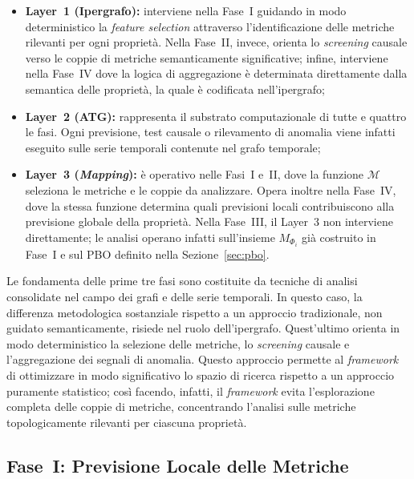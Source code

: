 \begin{itemize}
  \item \textbf{Layer~1 (Ipergrafo):} interviene nella Fase~I guidando in modo deterministico la
        \textit{feature selection} attraverso l'identificazione delle metriche rilevanti per ogni
        proprietà. Nella Fase~II, invece, orienta lo \textit{screening} causale verso le coppie
        di metriche semanticamente significative; infine, interviene nella Fase~IV dove la logica
        di aggregazione è determinata direttamente dalla semantica delle proprietà, la quale è
        codificata nell'ipergrafo;
  \item \textbf{Layer~2 (\gls{ATG}):} rappresenta il substrato computazionale di tutte e quattro
        le fasi. Ogni previsione, test causale o rilevamento di anomalia viene infatti eseguito
        sulle serie temporali contenute nel grafo temporale;
  \item \textbf{Layer~3 (\textit{Mapping}):} è operativo nelle Fasi~I e~II, dove la funzione
        $\mathcal{M}$ seleziona le metriche e le coppie da analizzare. Opera inoltre nella
        Fase~IV, dove la stessa funzione determina quali previsioni locali contribuiscono alla
        previsione globale della proprietà. Nella Fase~III, il Layer~3 non interviene direttamente;
        le analisi operano infatti sull'insieme $M_{\Phi_i}$ già costruito in Fase~I e sul \gls{PBO}
        definito nella Sezione~\ref{sec:pbo}.
\end{itemize}

Le fondamenta delle prime tre fasi sono costituite da tecniche di analisi consolidate nel campo dei
grafi e delle serie temporali. In questo caso, la differenza metodologica sostanziale rispetto a un
approccio tradizionale, non guidato semanticamente, risiede nel ruolo dell'ipergrafo. Quest'ultimo
orienta in modo deterministico la selezione delle metriche, lo \textit{screening} causale e
l'aggregazione dei segnali di anomalia. Questo approccio permette al \textit{framework} di
ottimizzare in modo significativo lo spazio di ricerca rispetto a un approccio puramente
statistico; così facendo, infatti, il \textit{framework} evita l'esplorazione completa delle
coppie di metriche, concentrando l'analisi sulle metriche topologicamente rilevanti per ciascuna
proprietà.

\subsection{Fase~I: Previsione Locale delle Metriche}
\label{sec:fase_1}

